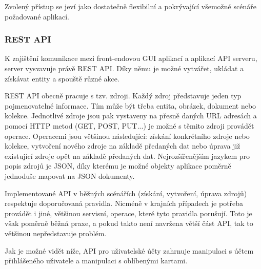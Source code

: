 		Zvolený přístup se jeví jako dostatečně flexibilní a pokrývající všemožné scénáře požadované aplikací.

		\subsubsection{REST API}

		K zajištění komunikace mezi front-endovou \ac{GUI} aplikací a aplikací \ac{API} serveru, server
		vysvavuje právě \ac{REST} \ac{API}.
		Díky němu je možné vytvářet, ukládat a získávat entity a spouště různé akce.

		\ac{REST} \ac{API} obecně pracuje s tzv. zdroji.
		Každý zdroj představuje jeden typ pojmenovatelné informace.
		Tím může být třeba entita, obrázek, dokument nebo kolekce.
		Jednotlivé zdroje jsou pak vystaveny na přesně daných \ac{URL} adresách a pomocí \ac{HTTP} metod (GET, POST, PUT...)
		je možné s těmito zdroji provádět operace.
		Operacemi jsou většinou následující: získání konkrétního zdroje nebo kolekce, vytvoření nového zdroje na základě
		předaných dat nebo úprava již existující zdroje opět na základě předaných dat.
		Nejrozšířenějším jazykem pro popis zdrojů je \ac{JSON}, díky kterému je možné objekty aplikace poměrně jednoduše
		mapovat na \ac{JSON} dokumenty. \cite{restfulapi}

		Implementované \ac{API} v běžných scénářích (získání, vytvoření, úprava zdrojů) respektuje doporučovaná pravidla.
		Nicméně v krajních případech je potřeba provádět i jiné, většinou servisní, operace, které tyto pravidla porušují.
		Toto je však poměrně běžná praxe, a pokud takto není navržena větší část \ac{API}, tak to většinou nepředstavuje
		problém.

		Jak je možné vidět níže, \ac{API} pro uživatelské účty zahrnuje manipulaci s účtem přihlášeného uživatele a manipulaci
		s oblíbenými kartami.

